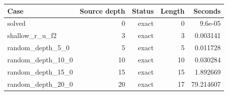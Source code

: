 {\small
\begin{tabular}{lrrrr}
\hline
Case & Source depth & Status & Length & Seconds \\
\hline
solved & 0 & exact & 0 & 9.6e-05 \\
shallow\_r\_u\_f2 & 3 & exact & 3 & 0.003141 \\
random\_depth\_5\_0 & 5 & exact & 5 & 0.011728 \\
random\_depth\_10\_0 & 10 & exact & 10 & 0.030284 \\
random\_depth\_15\_0 & 15 & exact & 15 & 1.892669 \\
random\_depth\_20\_0 & 20 & exact & 17 & 79.214607 \\
\hline
\end{tabular}
}
